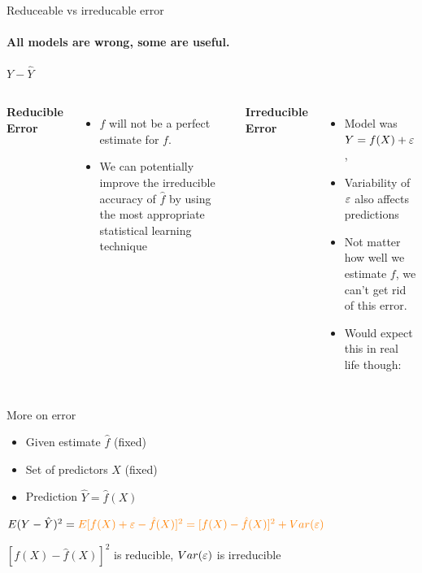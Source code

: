 \documentclass[aspectratio=169,usenames,dvipsnames]{beamer}
\newcommand{\InstructorNotes}[1]{{\color{orange}#1}}
\newcommand{\InstructorList}[1]{
\begin{itemize}
	\color{orange}
	#1
\end{itemize}
}
\begin{document}
\begin{frame}[t]{Reduceable vs irreducable error}
	\framesubtitle{
	All models are wrong, some are useful.
	}
	\centering

	$Y - \hat Y$

	\begin{columns}
	\centering
	\textbf{Reducible Error}

	\InstructorList{
		\item $\hat f$ will not be a perfect estimate for $f$.
		\item We can potentially improve the irreducible
		accuracy of $\hat f $ by using the most appropriate statistical learning technique 
	}

	\centering

	\textbf{Irreducible Error}

	\InstructorList{
		\item Model was $Y = f(X) + \varepsilon$,
		\item Variability of $\varepsilon$ also affects predictions
		\item Not matter how well we estimate $f$, we can't get rid of this error.
		\item Would expect this in real life though:
	}
	\end{columns}

\end{frame}
\begin{frame}[t]{More on error}
	\begin{itemize}
		\item
Given estimate $\hat f$ (fixed)
		\item
Set of predictors $X$  (fixed)
		\item
Prediction $\hat Y = \hat f(X)$
	\end{itemize}

\qquad

{
	\Large
	$
		E(Y-\hat Y)^2 =
		\InstructorNotes{E[f(X) + \e -\hat f(X)]^2 = [f(X) - \hat f (X)]^2 + Var(\e)}
		$
}

\InstructorNotes{$[f(X) - \hat f (X)]^2$ is reducible, $Var(\varepsilon)$ is irreducible}
\end{frame}
\end{document}
